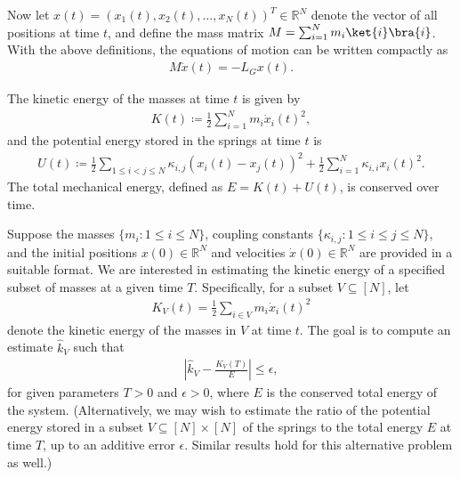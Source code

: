 \documentclass[superscriptaddress,onecolumn,nofootinbib,longbibliography,a4paper,accepted=2026-09-29]{quantumarticle}
\theoremstyle{plain}
\theoremstyle{definition}
\numberwithin{thm}{section}
\numberwithin{assumption}{section}
\numberwithin{lemma}{section}
\numberwithin{prop}{section}
\numberwithin{cor}{section}
\numberwithin{definition}{section}
\numberwithin{rmk}{section}
\numberwithin{equation}{section}
\newcommand{\abs}[1]      {\left| #1 \right|}
\begin{document}
Now let \( x(t)=(x_1(t), x_2(t), \dots, x_N(t))^T \in \mathbb{R}^N \) denote the vector of all positions at time \( t \), and define the mass matrix \( M = \sum_{i=1}^N m_i \ket{i}\bra{i} \). With the above  definitions, the equations of motion can be written compactly as
\begin{align}
M \ddot{x}(t) = -L_G x(t).    
\label{eq:coupled_linear_oscillators_equation}
\end{align}

The kinetic energy of the masses at time $t$ is given by
\begin{align}
K(t) \coloneqq \frac{1}{2} \sum_{i=1}^N m_i \dot{x}_i(t)^2,
\end{align}
and the potential energy stored in the springs at time $t$ is
\begin{align}
U(t) \coloneqq \frac{1}{2} \sum_{1\le i<j\le N} \kappa_{i,j} \left( x_i(t) - x_j(t) \right)^2+\frac{1}{2}\sum_{i=1}^N\kappa_{i,i}x_i(t)^2.
\end{align}
The total mechanical energy, defined as \( E = K(t) + U(t) \), is conserved over time.

Suppose the masses $\{ m_i : 1 \le i \le N \}$, coupling constants $\{ \kappa_{i,j} : 1 \le i \le j \le N \}$, and the initial positions $x(0) \in \mathbb{R}^N$ and velocities $\dot{x}(0) \in \mathbb{R}^N$ are provided in a suitable format. We are interested in estimating the kinetic energy of a specified subset of masses at a given time $T$. Specifically, for a subset $V \subseteq [N]$, let
\begin{align}
K_V(t) = \frac{1}{2} \sum_{i \in V} m_i \dot{x}_i(t)^2
\end{align}
denote the kinetic energy of the masses in $V$ at time $t$. The goal is to compute an estimate $\hat{k}_V$ such that
\begin{align}
\abs{\hat{k}_V - \frac{K_V(T)}{E}} \le \epsilon,
\end{align}
for given parameters $T > 0$ and $\epsilon > 0$, where $E$ is the conserved total energy of the system. (Alternatively, we may wish to estimate the ratio of the potential energy stored in a subset $V \subseteq [N] \times [N]$ of the springs to the total energy $E$
at time $T$, up to an additive error $\epsilon$. Similar results hold for this alternative problem as well.)
\end{document}
